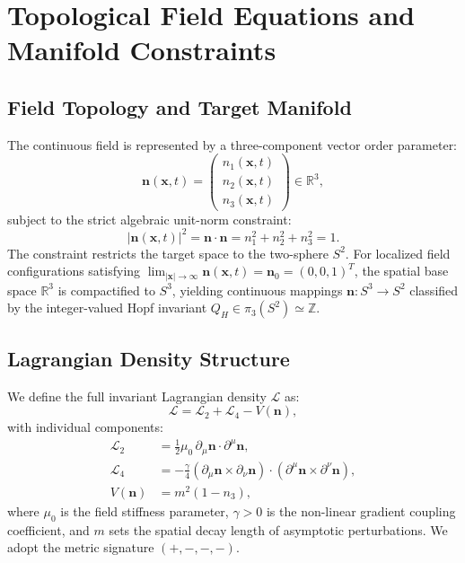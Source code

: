 \documentclass[11pt,a4paper]{article}
\begin{document}
	\section{Topological Field Equations and Manifold Constraints}
	\label{sec:field_eqs}
	
	\subsection{Field Topology and Target Manifold}
	The continuous field is represented by a three-component vector order parameter:
	\begin{equation}
		\mathbf{n}(\mathbf{x}, t) = \begin{pmatrix} n_1(\mathbf{x}, t) \\ n_2(\mathbf{x}, t) \\ n_3(\mathbf{x}, t) \end{pmatrix} \in \mathbb{R}^3,
	\end{equation}
	subject to the strict algebraic unit-norm constraint:
	\begin{equation}
		|\mathbf{n}(\mathbf{x}, t)|^2 = \mathbf{n} \cdot \mathbf{n} = n_1^2 + n_2^2 + n_3^2 = 1.
		\label{eq:unit_norm}
	\end{equation}
	The constraint restricts the target space to the two-sphere $S^2$. For localized field configurations satisfying $\lim_{|\mathbf{x}| \to \infty} \mathbf{n}(\mathbf{x}, t) = \mathbf{n}_0 = (0, 0, 1)^T$, the spatial base space $\mathbb{R}^3$ is compactified to $S^3$, yielding continuous mappings $\mathbf{n}: S^3 \to S^2$ classified by the integer-valued Hopf invariant $Q_H \in \pi_3(S^2) \simeq \mathbb{Z}$.
	
	\subsection{Lagrangian Density Structure}
	We define the full invariant Lagrangian density $\mathcal{L}$ as:
	\begin{equation}
		\mathcal{L} = \mathcal{L}_2 + \mathcal{L}_4 - V(\mathbf{n}),
		\label{eq:lagrangian_total}
	\end{equation}
	with individual components:
	\begin{align}
		\mathcal{L}_2 &= \frac{1}{2} \mu_0 \, \partial_\mu \mathbf{n} \cdot \partial^\mu \mathbf{n}, \label{eq:L2_def} \\
		\mathcal{L}_4 &= -\frac{\gamma}{4} \left( \partial_\mu \mathbf{n} \times \partial_\nu \mathbf{n} \right) \cdot \left( \partial^\mu \mathbf{n} \times \partial^\nu \mathbf{n} \right), \label{eq:L4_def} \\
		V(\mathbf{n}) &= m^2 (1 - n_3), \label{eq:V_def}
	\end{align}
	where $\mu_0$ is the field stiffness parameter, $\gamma > 0$ is the non-linear gradient coupling coefficient, and $m$ sets the spatial decay length of asymptotic perturbations. We adopt the metric signature $(+,-,-,-)$.
	
\end{document}
